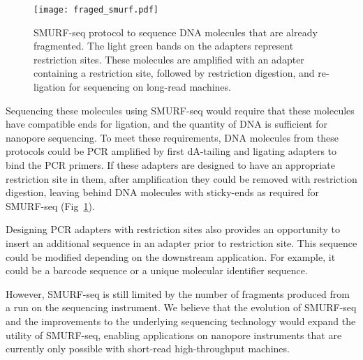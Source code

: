 \begin{figure}[t!]
\centering
\texttt{[image: fraged\_smurf.pdf]}
\caption[SMURF-seq protocol to sequence pre-fragmented DNA molecules]{
  SMURF-seq protocol to sequence DNA molecules that are
  already fragmented. The light green bands
  on the adapters represent restriction sites. These molecules are
  amplified with an adapter containing a restriction site, followed by
  restriction digestion, and re-ligation for sequencing on long-read
  machines.}
\label{fraged_smurf}
\end{figure}

%
Sequencing these molecules using SMURF-seq would require that these
molecules have compatible ends for ligation, and the quantity of DNA is
sufficient for nanopore sequencing.
To meet these requirements, DNA molecules from these protocols could be
PCR amplified by first dA-tailing and ligating adapters to bind the PCR
primers. If these adapters are designed to have an appropriate
restriction site in them, after amplification they could be removed with
restriction digestion, leaving behind DNA molecules with sticky-ends as
required for SMURF-seq (Fig~\ref{fraged_smurf}).

Designing PCR adapters with restriction sites  also provides an
opportunity to insert an additional sequence in an adapter prior to
restriction site. This sequence could be modified depending on the
downstream application. For example, it could be a barcode sequence or a
unique molecular identifier sequence.

However, SMURF-seq is still limited by the number of fragments produced
from a run on the sequencing instrument.  We believe that the evolution
of SMURF-seq and the improvements to the underlying sequencing
technology would expand the utility of SMURF-seq, enabling applications
on nanopore instruments that are currently only possible with short-read
high-throughput machines.
